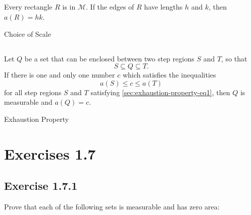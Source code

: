 \documentclass{report}
\begin{document}
\section{}%
\label{sec:area-choice-scale}

Every rectangle $R$ is in $\mathscr{M}$.
If the edges of $R$ have lengths $h$ and $k$, then $a(R) = hk$.

\begin{axiom}

    {Choice of Scale}

\end{axiom}

\section{}%
\label{sec:area-exhaustion-property}

Let $Q$ be a set that can be enclosed between two step regions $S$ and $T$, so
  that
  \begin{equation}
    \label{sec:exhaustion-property-eq1}
    S \subseteq Q \subseteq T.
  \end{equation}
If there is one and only one number $c$ which satisfies the inequalities
  $$a(S) \leq c \leq a(T)$$ for all step regions $S$ and $T$ satisfying
  \eqref{sec:exhaustion-property-eq1}, then $Q$ is measurable and $a(Q) = c$.

\begin{axiom}

    {Exhaustion Property}

\end{axiom}

\chapter{Exercises 1.7}%
\label{chap:exercises-1.7}

\section{Exercise 1.7.1}%
\label{sec:exercise-1.7.1}

Prove that each of the following sets is measurable and has zero area:

\subsection{}%
\label{sub:exercise-1.7.1a}
\end{document}

